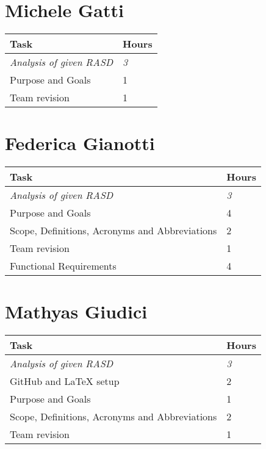 \section{Michele Gatti}

\:
\begin{center}
\begin{tabular}{ | p{9 cm} | p{3 cm}  |  }
  \hline
    \textbf{Task} & \textbf{Hours }\\ \hline
    \textit{Analysis of given RASD} & \textit{3} \\ \hline
    Purpose and Goals & 1 \\ \hline
    Team revision & 1 \\ \hline
\end{tabular}
\end{center}
\:


\section{Federica Gianotti}

\:
\begin{center}
\begin{tabular}{ | p{9 cm} | p{3 cm}  |  }
  \hline
    \textbf{Task} & \textbf{Hours }\\ \hline
    \textit{Analysis of given RASD} & \textit{3} \\ \hline
    Purpose and Goals & 4 \\ \hline
    Scope, Definitions, Acronyms and Abbreviations & 2 \\ \hline
    Team revision & 1 \\ \hline
    Functional Requirements & 4 \\ \hline
\end{tabular}
\end{center}
\:

\section{Mathyas Giudici}

\:
\begin{center}
\begin{tabular}{ | p{9 cm} | p{3 cm}  |  }
  \hline
    \textbf{Task} & \textbf{Hours }\\ \hline
    \textit{Analysis of given RASD} & \textit{3} \\ \hline
    GitHub and LaTeX setup & 2 \\ \hline
    Purpose and Goals & 1 \\ \hline
    Scope, Definitions, Acronyms and Abbreviations & 2 \\ \hline
    Team revision & 1 \\ \hline
\end{tabular}
\end{center}

\clearpage
